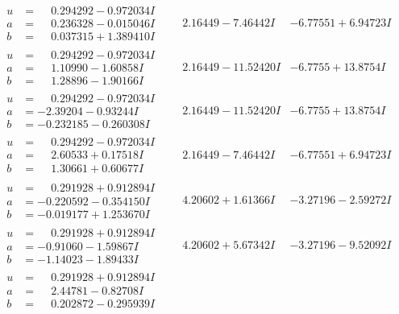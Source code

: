 \documentclass[1p]{elsarticle_modified}
\theoremstyle{definition}
\begin{document}
$$\begin{array}{c|c|c}
\begin{aligned}
u &= \phantom{-}0.294292 - 0.972034 I \\
a &= \phantom{-}0.236328 - 0.015046 I \\
b &= \phantom{-}0.037315 + 1.389410 I\end{aligned}
 & \phantom{-}2.16449 - 7.46442 I & -6.77551 + 6.94723 I \\ \hline\begin{aligned}
u &= \phantom{-}0.294292 - 0.972034 I \\
a &= \phantom{-}1.10990 - 1.60858 I \\
b &= \phantom{-}1.28896 - 1.90166 I\end{aligned}
 & \phantom{-}2.16449 - 11.52420 I & -6.7755 + 13.8754 I \\ \hline\begin{aligned}
u &= \phantom{-}0.294292 - 0.972034 I \\
a &= -2.39204 - 0.93244 I \\
b &= -0.232185 - 0.260308 I\end{aligned}
 & \phantom{-}2.16449 - 11.52420 I & -6.7755 + 13.8754 I \\ \hline\begin{aligned}
u &= \phantom{-}0.294292 - 0.972034 I \\
a &= \phantom{-}2.60533 + 0.17518 I \\
b &= \phantom{-}1.30661 + 0.60677 I\end{aligned}
 & \phantom{-}2.16449 - 7.46442 I & -6.77551 + 6.94723 I \\ \hline\begin{aligned}
u &= \phantom{-}0.291928 + 0.912894 I \\
a &= -0.220592 - 0.354150 I \\
b &= -0.019177 + 1.253670 I\end{aligned}
 & \phantom{-}4.20602 + 1.61366 I & -3.27196 - 2.59272 I \\ \hline\begin{aligned}
u &= \phantom{-}0.291928 + 0.912894 I \\
a &= -0.91060 - 1.59867 I \\
b &= -1.14023 - 1.89433 I\end{aligned}
 & \phantom{-}4.20602 + 5.67342 I & -3.27196 - 9.52092 I \\ \hline\begin{aligned}
u &= \phantom{-}0.291928 + 0.912894 I \\
a &= \phantom{-}2.44781 - 0.82708 I \\
b &= \phantom{-}0.202872 - 0.295939 I\end{aligned}

\end{array}$$
\end{document}
